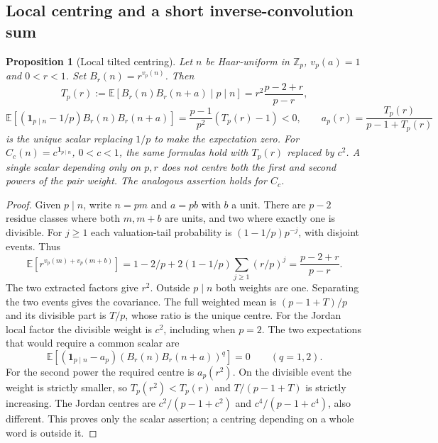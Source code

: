 \documentclass[11pt]{article}
\newtheorem{proposition}[theorem]{Proposition}
\theoremstyle{definition}
\newcommand{\E}{\mathbb E}
\newcommand{\Z}{\mathbb Z}
\newcommand{\ind}{\mathbf 1}
\theoremstyle{remark}
\numberwithin{equation}{section}
\begin{document}
\subsection{Local centring and a short inverse-convolution sum}
\begin{proposition}[Local tilted centring]\label{prop:d-centring}
Let $n$ be Haar-uniform in $\Z_p$, $v_p(a)=1$ and $0<r<1$. Set $B_r(n)=r^{v_p(n)}$.
Then
\begin{equation}\label{eq:d-local-t}
 T_p(r):=\E[B_r(n)B_r(n+a)\mid p\mid n]=r^2\frac{p-2+r}{p-r},
\end{equation}
\begin{equation}\label{eq:d-local-centre}
 \E[(\ind_{p\mid n}-1/p)B_r(n)B_r(n+a)]=\frac{p-1}{p^2}(T_p(r)-1)<0,
 \qquad a_p(r)=\frac{T_p(r)}{p-1+T_p(r)}
\end{equation}
is the unique scalar replacing $1/p$ to make the expectation zero.
For $C_c(n)=c^{\ind_{p\mid n}}$, $0<c<1$, the same formulas hold with $T_p(r)$ replaced by $c^2$.
A single scalar depending only on $p,r$ does not centre both the first and second powers of the
pair weight. The analogous assertion holds for $C_c$.
\end{proposition}
\begin{proof}
Given $p\mid n$, write $n=pm$ and $a=pb$ with $b$ a unit.
There are $p-2$ residue classes where both $m,m+b$ are units, and two where exactly one is divisible.
For $j\ge1$ each valuation-tail probability is $(1-1/p)p^{-j}$, with disjoint events.
Thus
\begin{equation}\label{eq:d-local-geometric}
 \E[r^{v_p(m)+v_p(m+b)}]
 =1-2/p+2(1-1/p)\sum_{j\ge1}(r/p)^j=\frac{p-2+r}{p-r}.
\end{equation}
The two extracted factors give $r^2$. Outside $p\mid n$ both weights are one.
Separating the two events gives the covariance. The full weighted mean is $(p-1+T)/p$ and its
divisible part is $T/p$, whose ratio is the unique centre. For the Jordan local factor the divisible
weight is $c^2$, including when $p=2$.
The two expectations that would require a common scalar are
\begin{equation}\label{eq:d-two-centres}
 \E[(\ind_{p\mid n}-a_p)(B_r(n)B_r(n+a))^q]=0\qquad(q=1,2).
\end{equation}
For the second power the required centre is $a_p(r^2)$. On the divisible event the weight is strictly
smaller, so $T_p(r^2)<T_p(r)$ and $T/(p-1+T)$ is strictly increasing.
The Jordan centres are $c^2/(p-1+c^2)$ and $c^4/(p-1+c^4)$, also different.
This proves only the scalar assertion; a centring depending on a whole word is outside it.
\end{proof}
\end{document}
